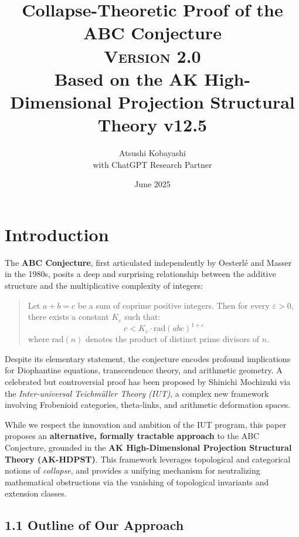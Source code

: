 \documentclass[11pt]{article}
\title{Collapse-Theoretic Proof of the ABC Conjecture\\
\Large \textsc{Version 2.0}\\
\small Based on the AK High-Dimensional Projection Structural Theory v12.5}
\author{Atsushi Kobayashi \\ \small with ChatGPT Research Partner}
\date{June 2025}
\begin{document}
\maketitle
\tableofcontents
\newpage


\section{Introduction}

The \textbf{ABC Conjecture}, first articulated independently by Oesterl\'e and Masser in the 1980s, posits a deep and surprising relationship between the additive structure and the multiplicative complexity of integers:
\begin{quote}
    Let $a + b = c$ be a sum of coprime positive integers. Then for every $\varepsilon > 0$, there exists a constant $K_\varepsilon$ such that:
    \[ c < K_\varepsilon \cdot \mathrm{rad}(abc)^{1+\varepsilon} \]
    where $\mathrm{rad}(n)$ denotes the product of distinct prime divisors of $n$.
\end{quote}

Despite its elementary statement, the conjecture encodes profound implications for Diophantine equations, transcendence theory, and arithmetic geometry. A celebrated but controversial proof has been proposed by Shinichi Mochizuki via the \emph{Inter-universal Teichm\"uller Theory (IUT)}, a complex new framework involving Frobenioid categories, theta-links, and arithmetic deformation spaces.

While we respect the innovation and ambition of the IUT program, this paper proposes an \textbf{alternative, formally tractable approach} to the ABC Conjecture, grounded in the \textbf{AK High-Dimensional Projection Structural Theory (AK-HDPST)}. This framework leverages topological and categorical notions of \emph{collapse}, and provides a unifying mechanism for neutralizing mathematical obstructions via the vanishing of topological invariants and extension classes.

\subsection*{1.1 Outline of Our Approach}
\end{document}

